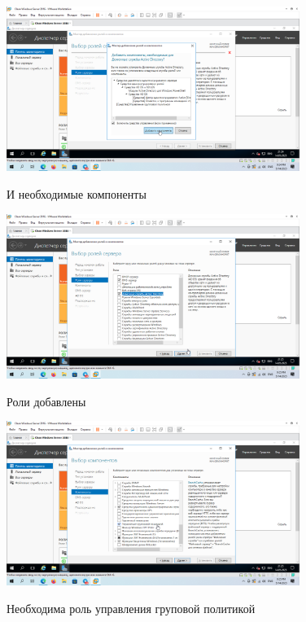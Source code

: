 \documentclass[a4paper]{article}
\begin{document}
  \begin{figure}[H]
    \centering
    \includegraphics[width=0.85\textwidth]{5_0034}
    \label{img:34}
    \caption{И необходимые компоненты}
  \end{figure}

  \begin{figure}[H]
    \centering
    \includegraphics[width=0.85\textwidth]{5_0035}
    \label{img:35}
    \caption{Роли добавлены}
  \end{figure}

  \begin{figure}[H]
    \centering
    \includegraphics[width=0.85\textwidth]{5_0036}
    \label{img:36}
    \caption{Необходима роль управления груповой политикой}
  \end{figure}
\end{document}
